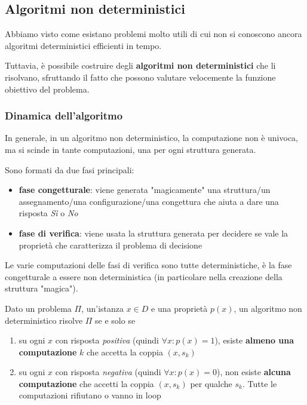 \subsection{Algoritmi non deterministici}

Abbiamo visto come esistano problemi molto utili di cui non si conoscono ancora algoritmi deterministici efficienti in tempo.

Tuttavia, è possibile costruire degli \textbf{algoritmi non deterministici} che li risolvano, sfruttando il fatto che possono valutare velocemente la funzione obiettivo del problema.

\subsubsection{Dinamica dell'algoritmo}

In generale, in un algoritmo non deterministico, la computazione non è univoca, ma si scinde in tante computazioni, una per ogni struttura generata.

\newpage

Sono formati da due fasi principali: 
\begin{itemize}
	\item \textbf{fase congetturale}: viene generata "magicamente" una struttura/un assegnamento/una configurazione/una congettura che aiuta a dare una risposta \textit{Sì} o \textit{No}
	\item \textbf{fase di verifica}: viene usata la struttura generata per decidere se vale la proprietà che caratterizza il problema di decisione
\end{itemize}

Le varie computazioni delle fasi di verifica sono tutte deterministiche, è la fase congetturale a essere non deterministica (in particolare nella creazione della struttura "magica").

Dato un problema $\Pi$, un'istanza $x \in D$ e una proprietà $p(x)$, un algoritmo non deterministico risolve $\Pi$ se e solo se
\begin{enumerate}
	\item su ogni $x$ con risposta \textit{positiva} (quindi $\forall x: p(x) = 1$), esiste \textbf{almeno una computazione} $k$ che accetta la coppia $(x, s_k)$
	\item su ogni $x$ con risposta \textit{negativa} (quindi $\forall x: p(x) = 0$), non esiste \textbf{alcuna computazione} che accetti la coppia $(x, s_k)$ per qualche $s_k$. Tutte le computazioni rifiutano o vanno in loop
\end{enumerate}

